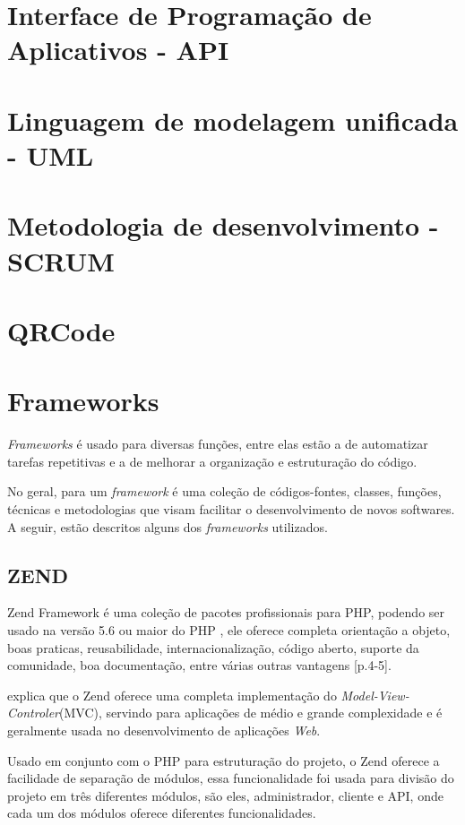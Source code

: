 \section{Interface de Programação de Aplicativos - API}

\section{Linguagem de modelagem unificada - UML}

\section{Metodologia de desenvolvimento - SCRUM}


\section{QRCode}

\section{Frameworks}
\textit{Frameworks} é usado para diversas funções, entre elas estão a de automatizar tarefas repetitivas e a de melhorar a organização e estruturação do código.  

No geral, para \cite{minetto2007} um \textit{framework} é uma coleção de códigos-fontes, classes, funções, técnicas e metodologias que visam facilitar o desenvolvimento de novos softwares. A seguir, estão descritos alguns dos \textit{frameworks} utilizados.

\subsection{ZEND}
Zend Framework é uma coleção de pacotes profissionais para PHP, podendo ser usado na versão 5.6 ou maior do PHP \cite{zend2018}, ele oferece completa orientação a objeto, boas praticas, reusabilidade, internacionalização, código aberto, suporte da comunidade, boa documentação, entre várias outras vantagens \cite{vaswani2010}[p.4-5].

\cite[p.3]{vaswani2010} explica que o Zend oferece uma completa implementação do \textit{Model-View-Controler}(MVC), servindo para aplicações de médio e grande complexidade e é geralmente usada no desenvolvimento de aplicações \textit{Web}.

Usado em conjunto com o PHP para estruturação do projeto, o Zend oferece a facilidade de separação de módulos, essa funcionalidade foi usada para divisão do projeto em três diferentes módulos, são eles, administrador, cliente e API, onde cada um dos módulos oferece diferentes funcionalidades.

